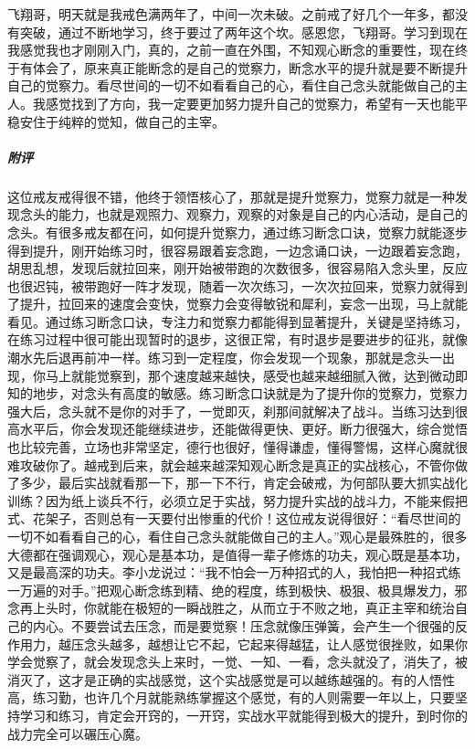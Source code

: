 \begin{case}
    飞翔哥，明天就是我戒色满两年了，中间一次未破。之前戒了好几个一年多，都没有突破，通过不断地学习，终于要过了两年这个坎。感恩您，飞翔哥。学习到现在我感觉我也才刚刚入门，真的，之前一直在外围，不知观心断念的重要性，现在终于有体会了，原来真正能断念的是自己的觉察力，断念水平的提升就是要不断提升自己的觉察力。看尽世间的一切不如看看自己的心，看住自己念头就能做自己的主人。我感觉找到了方向，我一定要更加努力提升自己的觉察力，希望有一天也能平稳安住于纯粹的觉知，做自己的主宰。
    \subparagraph{附评} 这位戒友戒得很不错，他终于领悟核心了，那就是提升觉察力，觉察力就是一种发现念头的能力，也就是观照力、观察力，观察的对象是自己的内心活动，是自己的念头。有很多戒友都在问，如何提升觉察力，通过练习断念口诀，觉察力就能逐步得到提升，刚开始练习时，很容易跟着妄念跑，一边念诵口诀，一边跟着妄念跑，胡思乱想，发现后就拉回来，刚开始被带跑的次数很多，很容易陷入念头里，反应也很迟钝，被带跑好一阵才发现，随着一次次练习，一次次拉回来，觉察力就得到了提升，拉回来的速度会变快，觉察力会变得敏锐和犀利，妄念一出现，马上就能看见。通过练习断念口诀，专注力和觉察力都能得到显著提升，关键是坚持练习，在练习过程中很可能出现暂时的退步，这很正常，有时退步是要进步的征兆，就像潮水先后退再前冲一样。练习到一定程度，你会发现一个现象，那就是念头一出现，你马上就能觉察到，那个速度越来越快，感受也越来越细腻入微，达到微动即知的地步，对念头有高度的敏感。练习断念口诀就是为了提升你的觉察力，觉察力强大后，念头就不是你的对手了，一觉即灭，刹那间就解决了战斗。当练习达到很高水平后，你会发现还能继续进步，还能做得更快、更好。断力很强大，综合觉悟也比较完善，立场也非常坚定，德行也很好，懂得谦虚，懂得警惕，这样心魔就很难攻破你了。越戒到后来，就会越来越深知观心断念是真正的实战核心，不管你做了多少，最后实战就看那一下，那一下不行，肯定会破戒，为何部队要大抓实战化训练？因为纸上谈兵不行，必须立足于实战，努力提升实战的战斗力，不能来假把式、花架子，否则总有一天要付出惨重的代价！这位戒友说得很好：“看尽世间的一切不如看看自己的心，看住自己念头就能做自己的主人。”观心是最殊胜的，很多大德都在强调观心，观心是基本功，是值得一辈子修炼的功夫，观心既是基本功，又是最高深的功夫。李小龙说过：“我不怕会一万种招式的人，我怕把一种招式练一万遍的对手。”把观心断念练到精、绝的程度，练到极快、极狠、极具爆发力，邪念再上头时，你就能在极短的一瞬战胜之，从而立于不败之地，真正主宰和统治自己的内心。不要尝试去压念，而是要觉察！压念就像压弹簧，会产生一个很强的反作用力，越压念头越多，越想让它不起，它起来得越猛，让人感觉很挫败，如果你学会觉察了，就会发现念头上来时，一觉、一知、一看，念头就没了，消失了，被消灭了，这才是正确的实战感觉，这个实战感觉是可以越练越强的。有的人悟性高，练习勤，也许几个月就能熟练掌握这个感觉，有的人则需要一年以上，只要坚持学习和练习，肯定会开窍的，一开窍，实战水平就能得到极大的提升，到时你的战力完全可以碾压心魔。
\end{case}

